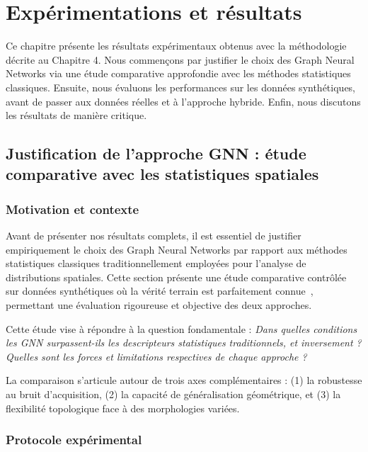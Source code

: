 
\chapter{Expérimentations et résultats}

Ce chapitre présente les résultats expérimentaux obtenus avec la méthodologie décrite au Chapitre 4. Nous commençons par justifier le choix des Graph Neural Networks via une étude comparative approfondie avec les méthodes statistiques classiques. Ensuite, nous évaluons les performances sur les données synthétiques, avant de passer aux données réelles et à l'approche hybride. Enfin, nous discutons les résultats de manière critique.

\section{Justification de l'approche GNN : étude comparative avec les statistiques spatiales}

\subsection{Motivation et contexte}

Avant de présenter nos résultats complets, il est essentiel de justifier empiriquement le choix des Graph Neural Networks par rapport aux méthodes statistiques classiques traditionnellement employées pour l'analyse de distributions spatiales. Cette section présente une étude comparative contrôlée sur données synthétiques où la vérité terrain est parfaitement connue~\cite{Martin2025GRETSI2}, permettant une évaluation rigoureuse et objective des deux approches.

Cette étude vise à répondre à la question fondamentale : \textit{Dans quelles conditions les GNN surpassent-ils les descripteurs statistiques traditionnels, et inversement ? Quelles sont les forces et limitations respectives de chaque approche ?}

La comparaison s'articule autour de trois axes complémentaires : (1) la robustesse au bruit d'acquisition, (2) la capacité de généralisation géométrique, et (3) la flexibilité topologique face à des morphologies variées.

\subsection{Protocole expérimental}

